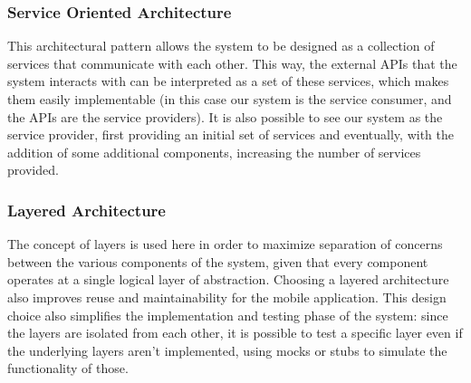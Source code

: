 \documentclass[12pt]{article}
\begin{document}
\newpage

\subsubsection{Service Oriented Architecture}

This architectural pattern allows the system to be designed as a collection of services that communicate with each other. This way, the external APIs that the system interacts with can be interpreted as a set of these services, which makes them easily implementable (in this case our system is the service consumer, and the APIs are the service providers). It is also possible to see our system as the service provider, first providing an initial set of services and eventually, with the addition of some additional components, increasing the number of services provided.

\subsubsection{Layered Architecture}

The concept of layers is used here in order to maximize separation of concerns between the various components of the system, given that every component operates at a single logical layer of abstraction. Choosing a layered architecture also improves reuse and maintainability for the mobile application. This design choice also simplifies the implementation and testing phase of the system: since the layers are isolated from each other, it is possible to test a specific layer even if the underlying layers aren't implemented, using mocks or stubs to simulate the functionality of those.
\end{document}
